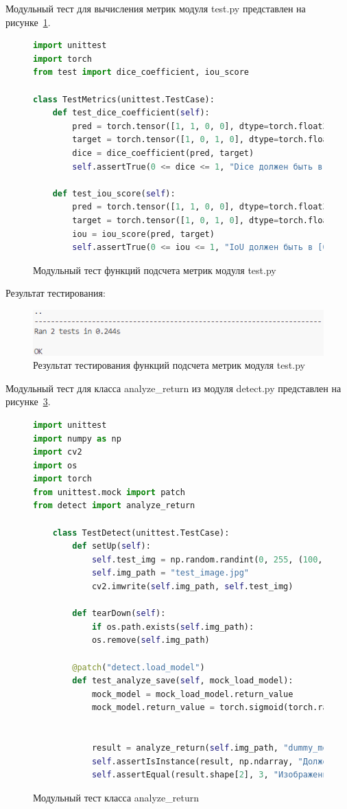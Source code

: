 Модульный тест для вычисления метрик модуля test.py представлен на рисунке~\ref{test_test:image}.

\begin{figure}[H]
	\begin{lstlisting}[language=Python]
import unittest
import torch
from test import dice_coefficient, iou_score

class TestMetrics(unittest.TestCase):
	def test_dice_coefficient(self):
		pred = torch.tensor([1, 1, 0, 0], dtype=torch.float32)
		target = torch.tensor([1, 0, 1, 0], dtype=torch.float32)
		dice = dice_coefficient(pred, target)
		self.assertTrue(0 <= dice <= 1, "Dice должен быть в [0, 1]")

	def test_iou_score(self):
		pred = torch.tensor([1, 1, 0, 0], dtype=torch.float32)
		target = torch.tensor([1, 0, 1, 0], dtype=torch.float32)
		iou = iou_score(pred, target)
		self.assertTrue(0 <= iou <= 1, "IoU должен быть в [0, 1]")
	\end{lstlisting}  
	\caption{Модульный тест функций подсчета метрик модуля test.py}
	\label{test_test:image}
\end{figure}

Результат тестирования:
\begin{figure}[H]
	\centering
	\includegraphics[width=0.7\linewidth]{images/test_test_results}
	\caption{Результат тестирования функций подсчета метрик модуля test.py}
	\label{fig:testtestresults}
\end{figure}

Модульный тест для класса analyze\_return из модуля detect.py представлен на рисунке~\ref{detect_test:image}.

\begin{figure}[H]
	\begin{lstlisting}[language=Python]
import unittest
import numpy as np
import cv2
import os
import torch
from unittest.mock import patch
from detect import analyze_return

	class TestDetect(unittest.TestCase):
		def setUp(self):
			self.test_img = np.random.randint(0, 255, (100, 100, 3), dtype=np.uint8)
			self.img_path = "test_image.jpg"
			cv2.imwrite(self.img_path, self.test_img)

		def tearDown(self):
			if os.path.exists(self.img_path):
			os.remove(self.img_path)

		@patch("detect.load_model")
		def test_analyze_save(self, mock_load_model):
			mock_model = mock_load_model.return_value
			mock_model.return_value = torch.sigmoid(torch.randn(1, 1, 320, 624))


			result = analyze_return(self.img_path, "dummy_model.pth")
			self.assertIsInstance(result, np.ndarray, "Должен возвращаться numpy-массив")
			self.assertEqual(result.shape[2], 3, "Изображение должно быть 3-канальным (BGR)")

	\end{lstlisting}  
	\caption{Модульный тест класса analyze\_return}
	\label{detect_test:image}
\end{figure}

